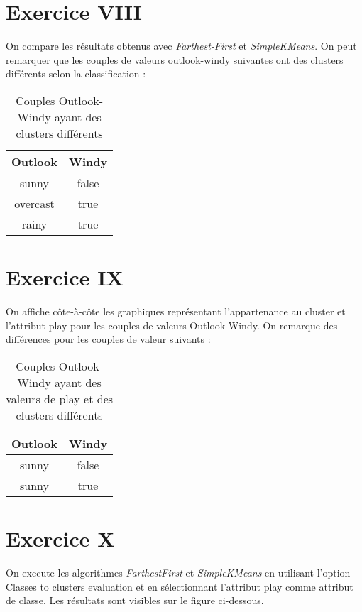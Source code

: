 \documentclass[a4paper, 11pt]{report}
\begin{document}
        \section{Exercice VIII}
        On compare les résultats obtenus avec \emph{Farthest-First} et \emph{SimpleKMeans}. On peut remarquer que les couples de valeurs outlook-windy suivantes ont des clusters différents selon la classification : 
        \begin{table}[h!]
        \centering
        \begin{tabular}{| c | c |}
         \hline
         Outlook & Windy \\
         \hline
         sunny & false \\
         overcast & true \\
         rainy & true\\
         \hline
        
        \end{tabular}
        \caption{Couples Outlook-Windy ayant des clusters différents}
        \label{tab:exo8}
        \end{table}
        
        \section{Exercice IX}
        On affiche côte-à-côte les graphiques représentant l'appartenance au cluster et l'attribut play pour les couples de valeurs Outlook-Windy.
        On remarque des différences pour les couples de valeur suivants :
        \begin{table}[h!]
        \centering
        \begin{tabular}{| c | c |}
         \hline
         Outlook & Windy \\
         \hline
         sunny & false \\
         sunny & true \\
         \hline
        
        \end{tabular}
        \caption{Couples Outlook-Windy ayant des valeurs de play et des clusters différents}
        \label{tab:exo9}
        \end{table}
        
	\section{Exercice X}
	On execute les algorithmes \emph{FarthestFirst} et \emph{SimpleKMeans} en utilisant l'option Classes to clusters evaluation et en sélectionnant l'attribut play comme attribut de classe. Les résultats sont visibles sur le figure ci-dessous.
\end{document}
